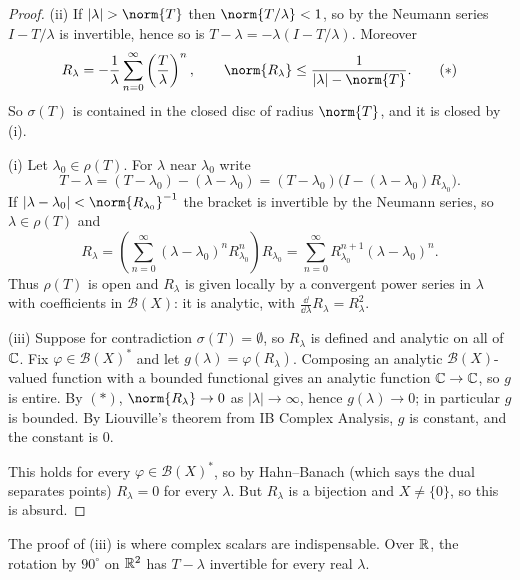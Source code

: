 \documentclass[a4paper]{scrartcl}
\newcommand{\Bop}{\mathcal{B}}
\begin{document}
\begin{proof}
	(ii) If $|\lambda|>\norm{T}$ then $\norm{T/\lambda}<1$, so by the Neumann series $I - T/\lambda$ is invertible, hence so is $T - \lambda = -\lambda(I - T/\lambda)$. Moreover
	\begin{equation*}
		R_\lambda = -\frac{1}{\lambda}\sum_{n=0}^\infty \left(\frac{T}{\lambda}\right)^n, \qquad \norm{R_\lambda}\leq\frac{1}{|\lambda|-\norm{T}}. \tag{$*$}
	\end{equation*}
	So $\sigma(T)$ is contained in the closed disc of radius $\norm{T}$, and it is closed by (i).

	(i) Let $\lambda_0\in\rho(T)$. For $\lambda$ near $\lambda_0$ write
	$$T - \lambda = (T-\lambda_0) - (\lambda - \lambda_0) = (T-\lambda_0)\big( I - (\lambda-\lambda_0)R_{\lambda_0}\big).$$
	If $|\lambda - \lambda_0| < \norm{R_{\lambda_0}}^{-1}$ the bracket is invertible by the Neumann series, so $\lambda \in\rho(T)$ and
	$$R_\lambda = \left( \sum_{n=0}^\infty (\lambda-\lambda_0)^n R_{\lambda_0}^n \right) R_{\lambda_0} = \sum_{n=0}^\infty R_{\lambda_0}^{n+1}(\lambda-\lambda_0)^n.$$
	Thus $\rho(T)$ is open and $R_\lambda$ is given locally by a convergent power series in $\lambda$ with coefficients in $\Bop(X)$: it is analytic, with $\frac{\dd}{\dd\lambda}R_\lambda = R_\lambda^2$.

	(iii) Suppose for contradiction $\sigma(T)=\emptyset$, so $R_\lambda$ is defined and analytic on all of $\mathbb{C}$. Fix $\varphi \in \Bop(X)^*$ and let $g(\lambda) = \varphi(R_\lambda)$. Composing an analytic $\Bop(X)$-valued function with a bounded functional gives an analytic function $\mathbb{C}\to\mathbb{C}$, so $g$ is entire. By $(*)$, $\norm{R_\lambda}\to0$ as $|\lambda|\to\infty$, hence $g(\lambda)\to0$; in particular $g$ is bounded. By Liouville's theorem from IB Complex Analysis, $g$ is constant, and the constant is $0$.

	This holds for every $\varphi \in \Bop(X)^*$, so by Hahn--Banach (which says the dual separates points) $R_\lambda = 0$ for every $\lambda$. But $R_\lambda$ is a bijection and $X \neq \{0\}$, so this is absurd.
\end{proof}

\begin{remark}
	The proof of (iii) is where complex scalars are indispensable. Over $\mathbb{R}$, the rotation by $90^\circ$ on $\mathbb{R}^2$ has $T-\lambda$ invertible for every real $\lambda$.
\end{remark}
\end{document}

